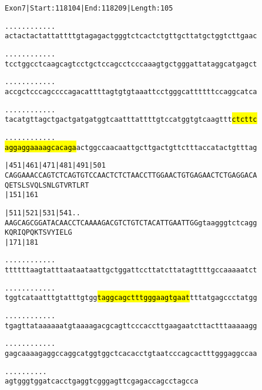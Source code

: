 \documentclass{article}
\begin{document}
\newpage
\begin{alltt}
Exon 7 | Start: 118104 | End: 118209 | Length: 105

.    .    .    .    .    .    .    .    .    .    .    .    
actactactattattttgtagagactgggtctcactctgttgcttatgctggtcttgaac

.    .    .    .    .    .    .    .    .    .    .    .    
tcctggcctcaagcagtcctgctccagcctcccaaagtgctgggattataggcatgagct

.    .    .    .    .    .    .    .    .    .    .    .    
accgctcccagccccagacattttagtgtgtaaattcctgggcattttttccaggcatca

.    .    .    .    .    .    .    .    .    .    .    .    
tacatgttagctgactgatgatggtcaatttattttgtccatggtgtcaagttt\hl{ctcttc}

.    .    .    .    .    .    .    .    .    .    .    .    
\hl{aggaggaaaagcacaga}actggccaacaattgcttgactgttctttaccatactgtttag

         |451      |461      |471      |481      |491      |501
CAGGAAACCAGTCTCAGTGTCCAACTCTCTAACCTTGGAACTGTGAGAACTCTGAGGACA
Q  E  T  S  L  S  V  Q  L  S  N  L  G  T  V  R  T  L  R  T  
         |151                          |161                 

         |511      |521      |531      |541       .    .    
AAGCAGCGGATACAACCTCAAAAGACGTCTGTCTACATTGAATTGGgtaagggtctcagg
K  Q  R  I  Q  P  Q  K  T  S  V  Y  I  E  L  G              
         |171                          |181                 

.    .    .    .    .    .    .    .    .    .    .    .    
ttttttaagtatttaataataattgctggattccttatcttatagttttgccaaaaatct

.    .    .    .    .    .    .    .    .    .    .    .    
tggtcataatttgtatttgtgg\hl{taggcagctttgggaagtgaat}tttatgagccctatgg

.    .    .    .    .    .    .    .    .    .    .    .    
tgagttataaaaaatgtaaaagacgcagttcccaccttgaagaatcttactttaaaaagg

.    .    .    .    .    .    .    .    .    .    .    .    
gagcaaaagaggccaggcatggtggctcacacctgtaatcccagcactttgggaggccaa

.    .    .    .    .    .    .    .    .    .
agtgggtggatcacctgaggtcgggagttcgagaccagcctagcca
\end{alltt}
\newpage
\end{document}
